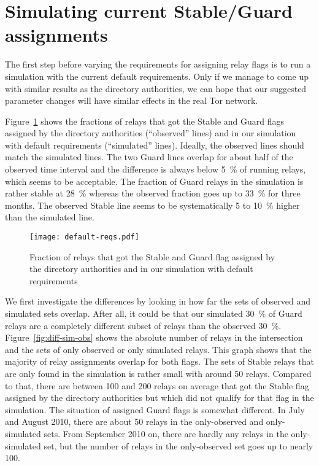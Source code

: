\documentclass{article}
\begin{document}
\section{Simulating current Stable/Guard assignments}

The first step before varying the requirements for assigning relay flags
is to run a simulation with the current default requirements.
Only if we manage to come up with similar results as the directory
authorities, we can hope that our suggested parameter changes will have
similar effects in the real Tor network.

Figure~\ref{fig:default-reqs} shows the fractions of relays that got the
Stable and Guard flags assigned by the directory
authorities (``observed'' lines) and in our simulation with default
requirements (``simulated'' lines).
Ideally, the observed lines should match the simulated lines.
The two Guard lines overlap for about half of the observed time interval
and the difference is always below 5~\% of running relays, which seems to
be acceptable.
The fraction of Guard relays in the simulation is rather stable at 28~\%
whereas the observed fraction goes up to 33~\% for three months.
The observed Stable line seems to be systematically 5 to 10~\% higher than
the simulated line.

\begin{figure}[t]
\texttt{[image: default-reqs.pdf]}
\caption{Fraction of relays that got the Stable and Guard flag assigned by
the directory authorities and in our simulation with default requirements}
\label{fig:default-reqs}
\end{figure}

We first investigate the differences by looking in how far the sets of
observed and simulated sets overlap.
After all, it could be that our simulated 30~\% of Guard relays are a
completely different subset of relays than the observed 30~\%.
Figure~\ref{fig:diff-sim-obs} shows the absolute number of relays in the
intersection and the sets of only observed or only simulated relays.
This graph shows that the majority of relay assignments overlap for both
flags.
The sets of Stable relays that are only found in the simulation is rather
small with around 50 relays.
Compared to that, there are between 100 and 200 relays on average that got
the Stable flag assigned by the directory authorities but which did not
qualify for that flag in the simulation.
The situation of assigned Guard flags is somewhat different.
In July and August 2010, there are about 50 relays in the only-observed
and only-simulated sets.
From September 2010 on, there are hardly any relays in the only-simulated
set, but the number of relays in the only-observed set goes up to nearly
100.
\end{document}
